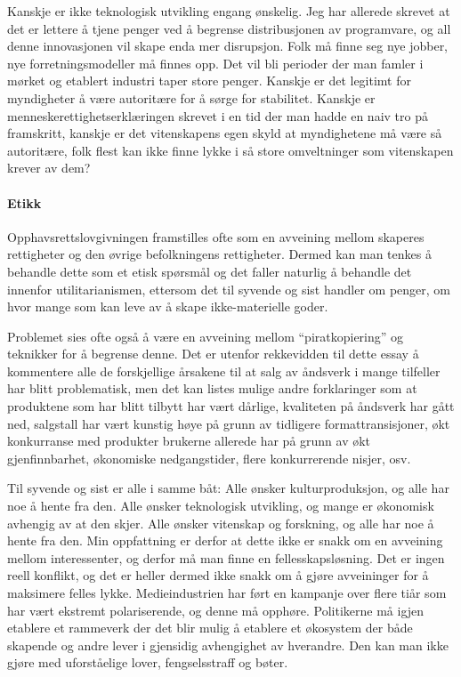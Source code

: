 \documentclass[11pt,norsk,a4paper]{article}
\begin{document}
Kanskje er ikke teknologisk utvikling engang ønskelig. Jeg har
allerede skrevet at det er lettere å tjene penger ved å begrense
distribusjonen av programvare, og all denne innovasjonen vil skape
enda mer disrupsjon. Folk må finne seg nye jobber, nye
forretningsmodeller må finnes opp. Det vil bli perioder der man famler
i mørket og etablert industri taper store penger. Kanskje er det
legitimt for myndigheter å være autoritære for å sørge for
stabilitet. Kanskje er menneskerettighetserklæringen skrevet i en tid
der man hadde en naiv tro på framskritt, kanskje er det vitenskapens
egen skyld at myndighetene må være så autoritære, folk flest kan ikke
finne lykke i  så store omveltninger som vitenskapen krever av dem?

\paragraph{Etikk}

Opphavsrettslovgivningen framstilles ofte som en avveining mellom
skaperes rettigheter og den øvrige befolkningens rettigheter. Dermed
kan man tenkes å behandle dette som et etisk spørsmål og det faller
naturlig å behandle det innenfor utilitarianismen, ettersom det til
syvende og sist handler om penger, om hvor mange som kan leve av å
skape ikke-materielle goder.

Problemet sies ofte også å være en avveining mellom ``piratkopiering''
og teknikker for å begrense denne. Det er utenfor rekkevidden til
dette essay å kommentere alle de forskjellige årsakene til at
salg av åndsverk i mange tilfeller har blitt problematisk, men det
kan listes mulige andre forklaringer som at produktene som har blitt
tilbytt har vært dårlige, kvaliteten på åndsverk har gått ned,
salgstall har vært kunstig høye på grunn av tidligere
formattransisjoner, økt konkurranse med produkter brukerne allerede
har på grunn av økt gjenfinnbarhet, økonomiske nedgangstider, flere
konkurrerende nisjer, osv. 

Til syvende og sist er alle i samme båt: Alle ønsker kulturproduksjon,
og alle har noe å hente fra den. Alle ønsker teknologisk utvikling, og
mange er økonomisk avhengig av at den skjer. Alle ønsker vitenskap og
forskning, og alle har noe å hente fra den. 
Min oppfattning er derfor at dette ikke er snakk om en avveining
mellom interessenter, og derfor må man finne en
fellesskapsløsning. Det er ingen reell konflikt, og det er heller
dermed ikke snakk om å gjøre avveininger for å maksimere felles
lykke. Medieindustrien har ført en kampanje over flere
tiår som har vært ekstremt polariserende, og denne må
opphøre. Politikerne må igjen etablere et rammeverk der det blir mulig
å etablere et økosystem der både skapende og andre lever i gjensidig
avhengighet av hverandre. Den kan man ikke gjøre med uforståelige
lover, fengselsstraff og bøter. 

{}

\end{document}
